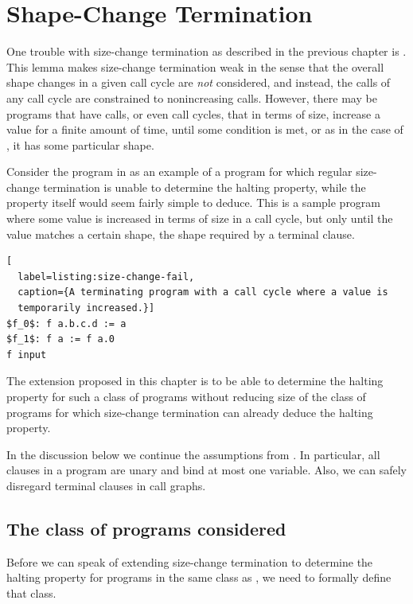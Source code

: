 \chapter{Shape-Change Termination}

One trouble with size-change termination as described in the previous chapter
is . This lemma makes size-change termination weak
in the sense that the overall shape changes in a given call cycle are
\emph{not} considered, and instead, the calls of any call cycle are constrained
to nonincreasing calls. However, there may be programs that have calls, or even
call cycles, that in terms of size, increase a value for a finite amount of
time, until some condition is met, or as in the case of \D{}, it has some
particular shape.

Consider the program in  as an example of a
program for which regular size-change termination is unable to determine the
halting property, while the property itself would seem fairly simple to deduce.
This is a sample program where some value is increased in terms of size in a
call cycle, but only until the value matches a certain shape, the shape
required by a terminal clause.

\begin{lstlisting}[
  label=listing:size-change-fail,
  caption={A terminating program with a call cycle where a value is
  temporarily increased.}]
$f_0$: f a.b.c.d := a
$f_1$: f a := f a.0
f input
\end{lstlisting}

The extension proposed in this chapter is to be able to determine the halting
property for such a class of programs without reducing size of the class of
programs for which size-change termination can already deduce the halting
property.

In the discussion below we continue the assumptions from
. In particular, all clauses in a
program are unary and bind at most one variable. Also, we can safely disregard
terminal clauses in call graphs.

\section{The class of programs considered}

Before we can speak of extending size-change termination to determine the
halting property for programs in the same class as
, we need to formally define that class.

